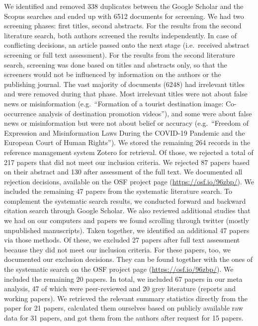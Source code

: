 \documentclass[
  doc,floatsintext]{apa6}
\begin{document}
We identified and removed 338 duplicates between the Google Scholar and the Scopus searches and ended up with 6512 documents for screening. We had two screening phases: first titles, second abstracts. For the results from the second literature search, both authors screened the results independently. In case of conflicting decisions, an article passed onto the next stage (i.e.~received abstract screening or full text assessment). For the results from the second literature search, screening was done based on titles and abstracts only, so that the screeners would not be influenced by information on the authors or the publishing journal. The vast majority of documents (6248) had irrelevant titles and were removed during that phase. Most irrelevant titles were not about false news or misinformation (e.g.~``Formation of a tourist destination image: Co-occurrence analysis of destination promotion videos''), and some were about false news or misinformation but were not about belief or accuracy (e.g.~``Freedom of Expression and Misinformation Laws During the COVID-19 Pandemic and the European Court of Human Rights''). We stored the remaining 264 records in the reference management system Zotero for retrieval. Of those, we rejected a total of 217 papers that did not meet our inclusion criteria. We rejected 87 papers based on their abstract and 130 after assessment of the full text. We documented all rejection decisions, available on the OSF project page (\url{https://osf.io/96zbp/}). We included the remaining 47 papers from the systematic literature search. To complement the systematic search results, we conducted forward and backward citation search through Google Scholar. We also reviewed additional studies that we had on our computers and papers we found scrolling through twitter (mostly unpublished manuscripts). Taken together, we identified an additional 47 papers via those methods. Of these, we excluded 27 papers after full text assessment because they did not meet our inclusion criteria. For these papers, too, we documented our exclusion decisions. They can be found together with the ones of the systematic search on the OSF project page (\url{https://osf.io/96zbp/}). We included the remaining 20 papers. In total, we included 67 papers in our meta analysis, 47 of which were peer-reviewed and 20 grey literature (reports and working papers). We retrieved the relevant summary statistics directly from the paper for 21 papers, calculated them ourselves based on publicly available raw data for 31 papers, and got them from the authors after request for 15 papers.
\end{document}
